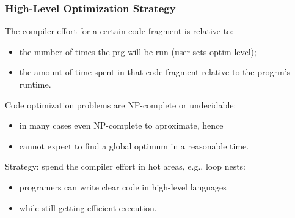 \documentclass{beamer}
\begin{document}
\begin{frame}\frametitle{High-Level Optimization Strategy}

The compiler effort for a certain code fragment is relative to:

\smallskip

\begin{itemize}

\item the number of times the prg will be run (user sets optim level);\smallskip

\item the amount of time spent in that code fragment relative to the
        progrm's runtime.\smallskip

\end{itemize}

\pause
\bigskip

Code optimization problems are NP-complete or undecidable:

\smallskip

\begin{itemize}

\item in many cases even NP-complete to aproximate, hence\smallskip

\item cannot expect to find a global optimum in a reasonable time.\smallskip

\end{itemize}

\pause
\bigskip

Strategy: spend the compiler effort in hot areas, e.g., loop nests:

\begin{itemize}

\item programers can write clear code in high-level languages\smallskip

\item while still getting efficient execution.\smallskip

\end{itemize}

\end{frame}
\end{document}
